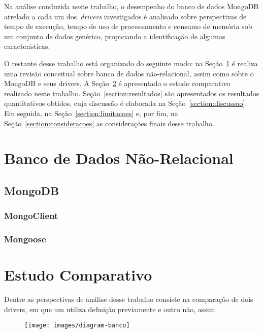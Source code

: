 \documentclass[12pt]{article}
\begin{document}
Na análise conduzida neste trabalho, o desempenho do banco de dados MongoDB atrelado a cada um dos~\emph{drivers} investigados é analisado sobre perspectivas de tempo de execução, tempo de uso de processamento e consumo de memória sob um conjunto de dados genérico, propiciando a identificação de algumas características.

O restante desse trabalho está organizado do seguinte modo: na Seção~\ref{section:nao-relacional} é realiza uma revisão conceitual sobre banco de dados não-relacional, assim como sobre o MongoDB e seus drivers. A Seção~\ref{section:estudo} é apresentado o estudo comparativo realizado neste trabalho. Seção~\ref{section:resultados} são apresentados os resultados quantitativos obtidos, cuja discussão é elaborada na Seção~\ref{section:discussao}. Em seguida, na Seção~\ref{section:limitacoes} e, por fim, na Seção~\ref{section:consideracoes} as considerações finais desse trabalho.


\section{Banco de Dados Não-Relacional}
\label{section:nao-relacional}

\subsection{MongoDB}


\subsubsection{MongoClient}

\subsubsection{Mongoose}



\section{Estudo Comparativo}
\label{section:estudo}

Dentre as perspectivas de análise desse trabalho consiste na comparação de dois drivers, em que um utiliza definição previamente e outro não, assim

\begin{figure}[h]
    \centering
    \texttt{[image: images/diagram-banco]}
    \label{fig:diagrama-banco}
\end{figure}
\end{document}
